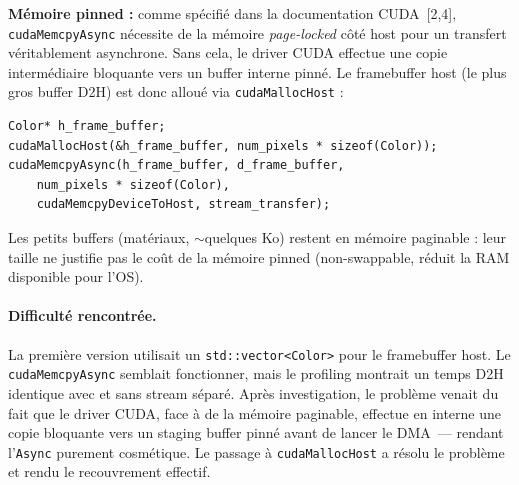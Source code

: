\documentclass[12pt,a4paper]{article}
\begin{document}
\textbf{M\'{e}moire pinned :} comme sp\'{e}cifi\'{e} dans la documentation CUDA~[2,4], \texttt{cudaMemcpyAsync} n\'{e}cessite de la m\'{e}moire \textit{page-locked} c\^{o}t\'{e} host pour un transfert v\'{e}ritablement asynchrone. Sans cela, le driver CUDA effectue une copie interm\'{e}diaire bloquante vers un buffer interne pinn\'{e}. Le framebuffer host (le plus gros buffer D2H) est donc allou\'{e} via \texttt{cudaMallocHost} :

\begin{lstlisting}[caption={Pinned memory pour le framebuffer}]
Color* h_frame_buffer;
cudaMallocHost(&h_frame_buffer, num_pixels * sizeof(Color));
cudaMemcpyAsync(h_frame_buffer, d_frame_buffer,
    num_pixels * sizeof(Color),
    cudaMemcpyDeviceToHost, stream_transfer);
\end{lstlisting}

Les petits buffers (mat\'{e}riaux, $\sim$quelques Ko) restent en m\'{e}moire paginable : leur taille ne justifie pas le co\^{u}t de la m\'{e}moire pinned (non-swappable, r\'{e}duit la RAM disponible pour l'OS).

\paragraph{Difficult\'{e} rencontr\'{e}e.}
La premi\`{e}re version utilisait un \texttt{std::vector<Color>} pour le framebuffer host. Le \texttt{cudaMemcpyAsync} semblait fonctionner, mais le profiling montrait un temps D2H identique avec et sans stream s\'{e}par\'{e}. Apr\`{e}s investigation, le probl\`{e}me venait du fait que le driver CUDA, face \`{a} de la m\'{e}moire paginable, effectue en interne une copie bloquante vers un staging buffer pinn\'{e} avant de lancer le DMA~--- rendant l'\texttt{Async} purement cosmétique. Le passage \`{a} \texttt{cudaMallocHost} a r\'{e}solu le probl\`{e}me et rendu le recouvrement effectif.
\end{document}
